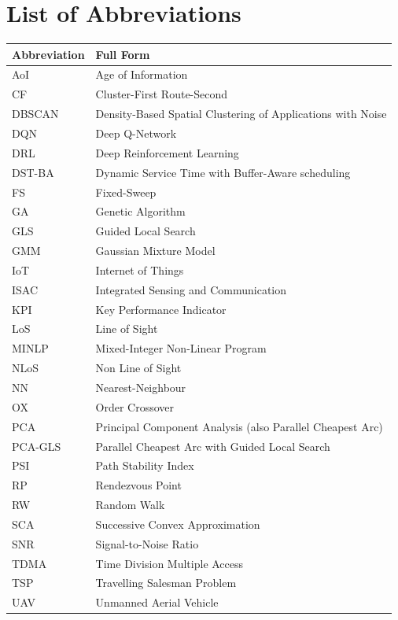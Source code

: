 \documentclass[12pt, a4paper, oneside]{report}
\begin{document}
\appendix
\chapter{List of Abbreviations}

\begin{tabular}{ll}
\toprule
\textbf{Abbreviation} & \textbf{Full Form} \\
\midrule
AoI & Age of Information \\
CF & Cluster-First Route-Second \\
DBSCAN & Density-Based Spatial Clustering of Applications with Noise \\
DQN & Deep Q-Network \\
DRL & Deep Reinforcement Learning \\
DST-BA & Dynamic Service Time with Buffer-Aware scheduling \\
FS & Fixed-Sweep \\
GA & Genetic Algorithm \\
GLS & Guided Local Search \\
GMM & Gaussian Mixture Model \\
IoT & Internet of Things \\
ISAC & Integrated Sensing and Communication \\
KPI & Key Performance Indicator \\
LoS & Line of Sight \\
MINLP & Mixed-Integer Non-Linear Program \\
NLoS & Non Line of Sight \\
NN & Nearest-Neighbour \\
OX & Order Crossover \\
PCA & Principal Component Analysis (also Parallel Cheapest Arc) \\
PCA-GLS & Parallel Cheapest Arc with Guided Local Search \\
PSI & Path Stability Index \\
RP & Rendezvous Point \\
RW & Random Walk \\
SCA & Successive Convex Approximation \\
SNR & Signal-to-Noise Ratio \\
TDMA & Time Division Multiple Access \\
TSP & Travelling Salesman Problem \\
UAV & Unmanned Aerial Vehicle \\
\bottomrule
\end{tabular}
\end{document}
